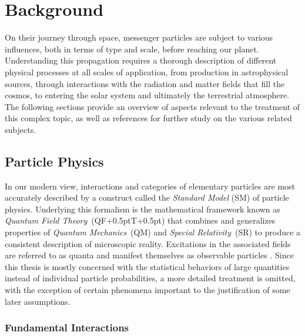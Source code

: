 \let\backupskip\chapterheadstartvskip
\renewcommand*\chapterheadstartvskip{\vspace*{3\topskip}} 
\chapter{Background}
\label{ch:background}
\let\chapterheadstartvskip\backupskip

On their journey through space, messenger particles are subject to various influences, both in terms of type and scale,
before reaching our planet. Understanding this propagation requires a thorough description of different physical processes
at all scales of application, from production in astrophysical sources, through interactions with the radiation and matter
fields that fill the cosmos, to entering the solar system and ultimately the terrestrial atmosphere. The following sections
provide an overview of aspects relevant to the treatment of this complex topic, as well as references for further study on
the various related subjects.



\section{Particle Physics}
\label{sec:particle}

In our modern view, interactions and categories of elementary particles are most accurately described by a construct called the
\emph{Standard Model} (SM) of particle physics. Underlying this formalism is the mathematical framework known as
\emph{Quantum Field Theory}~(QF{\kern+0.5pt}T{\kern+0.5pt}) that combines and generalizes properties of
\emph{Quantum Mechanics}~(QM) and \emph{Special Relativity}~(SR) to produce a consistent description of microscopic reality.
Excitations in the associated fields are referred to as quanta and manifest themselves as observable particles \cite{Peskin_1995}.
Since this thesis is mostly concerned with the statistical behaviors of large quantities instead of individual particle probabilities,
a more detailed treatment is omitted, with the exception of certain phenomena important to the justification of some later assumptions.



\subsection{Fundamental Interactions}
\label{sub:interactions}

